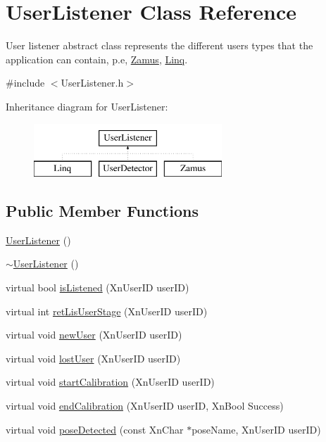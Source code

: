 \hypertarget{classUserListener}{
\section{UserListener Class Reference}
\label{classUserListener}
}


User listener abstract class represents the different users types that the application can contain, p.e, \hyperlink{classZamus}{Zamus}, \hyperlink{classLinq}{Linq}.  




{\ttfamily \#include $<$UserListener.h$>$}

Inheritance diagram for UserListener:\begin{figure}[H]
\begin{center}
\leavevmode
\includegraphics[height=2cm]{classUserListener}
\end{center}
\end{figure}
\subsection*{Public Member Functions}
\begin{DoxyCompactItemize}
\item 
\hyperlink{classUserListener_a593567c1539186c1b3e5781be52bfd80}{UserListener} ()
\item 
\hyperlink{classUserListener_abca800235b1afb94a98e28412e971a9e}{$\sim$UserListener} ()
\item 
virtual bool \hyperlink{classUserListener_aea80d4da192afaf0329cf92e4489fd0a}{isListened} (XnUserID userID)
\item 
virtual int \hyperlink{classUserListener_ad28b54b309b207f197ed238263d1014e}{retLisUserStage} (XnUserID userID)
\item 
virtual void \hyperlink{classUserListener_a4e7335d446ea94445305fb88b5612091}{newUser} (XnUserID userID)
\item 
virtual void \hyperlink{classUserListener_a399b56657670357e6545536732c38da2}{lostUser} (XnUserID userID)
\item 
virtual void \hyperlink{classUserListener_ae54282ac916fa8e2735b69a4d474c73a}{startCalibration} (XnUserID userID)
\item 
virtual void \hyperlink{classUserListener_a76796b86efc4cc8fc1fc250149092c1e}{endCalibration} (XnUserID userID, XnBool Success)
\item 
virtual void \hyperlink{classUserListener_a52680abee2bb2da94e748b394a435edc}{poseDetected} (const XnChar $\ast$poseName, XnUserID userID)
\end{DoxyCompactItemize}
